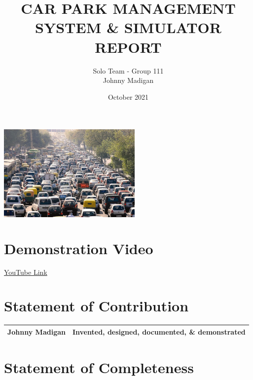 \documentclass[a4paper]{article}
\title{CAR PARK MANAGEMENT SYSTEM \& SIMULATOR REPORT\vspace{-3ex}}
\author{Solo Team - Group 111\\Johnny Madigan} %
\date{\vspace{-3ex}October 2021\vspace{20ex}}
\begin{document}
\maketitle
\begin{center}
\includegraphics[width=7cm]{report-img/title-pic.jpg}
\end{center}
\newpage
\tableofcontents
\newpage

\section{Demonstration Video}\label{sec:demo}

\par \href{https://youtu.be/-4QtDzU25com}{YouTube Link}

\section{Statement of Contribution}\label{sec:contribution}

\begin{tabular}{ |l|l| }
\hline
 \cellcolor{gray!10}\textbf{Johnny Madigan} & Invented, designed, documented, \& demonstrated\\
\hline
\end{tabular}

\section{Statement of Completeness}\label{sec:completeness}
\end{document}
